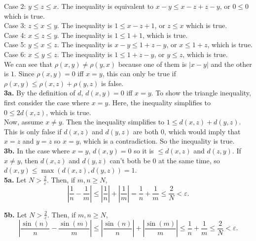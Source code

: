 \documentclass{article}
\newcommand{\eps}{\varepsilon}
\begin{document}
Case 2: $y \le z \le x$. The inequality is equivalent to $x - y \le x - z + z - y$, or $0 \le 0$ which is true. \\

Case 3: $z \le x \le y$. The inequality is $1 \le x - z + 1$, or $z \le x$ which is true. \\

Case 4: $x \le z \le y$. The inequality is $1 \le 1 + 1$, which is true. \\

Case 5: $y \le x \le z$. The inequality is $x - y \le 1 + z - y$, or $x \le 1 + z$, which is true. \\

Case 6: $x \le y \le z$. The inequality is $1 \le 1 + z - y$, or $y \le z$, which is true. \\

We can see that $\rho(x, y) \neq \rho(y, x)$ because one of them is $|x - y|$ and the other is $1$. Since $\rho(x, y) = 0$ iff $x = y$, this can only be true if $\rho(x, y) \le \rho(x, z) + \rho(y, z)$ is false. \\

\textbf{3a.} By the definition of $d$, $d(x, y) = 0$ iff $x = y$. To show the triangle inequality, first consider the case where $x = y$. Here, the inequality simplifies to $0 \le 2d(x, z)$, which is true. \\

Now, assume $x \neq y$. Then the inequality simplifies to $1 \le d(x, z) + d(y, z)$. This is only false if $d(x, z)$ and $d(y, z)$ are both $0$, which would imply that $x = z$ and $y = z$ so $x = y$, which is a contradiction. So the inequality is true. \\

\textbf{3b.} In the case where $x = y$, $d(x, y) = 0$ so it is $\le d(x, z)$ and $d(z, y)$. If $x \neq y$, then $d(x, z)$ and $d(y, z)$ can't both be $0$ at the same time, so $d(x, y) \le \max(d(x, z), d(y, z)) = 1$. \\

\textbf{5a.} Let $N > \frac{2}{\eps}$. Then, if $m, n \ge N$,
$$\left|\frac{1}{n} - \frac{1}{m}\right| \le \left|\frac{1}{n}\right| + \left|\frac{1}{m}\right| = \frac{1}{n} + \frac{1}{m} \le \frac{2}{N} < \eps.$$

\textbf{5b.} Let $N > \frac{2}{\eps}$. Then, if $m, n \ge N$,
$$\left|\frac{\sin(n)}{n} - \frac{\sin(m)}{m}\right| \le \left|\frac{\sin(n)}{n}\right| + \left|\frac{\sin(m)}{m}\right| \le \frac{1}{n} + \frac{1}{m} \le \frac{2}{N} < \eps.$$
\end{document}
